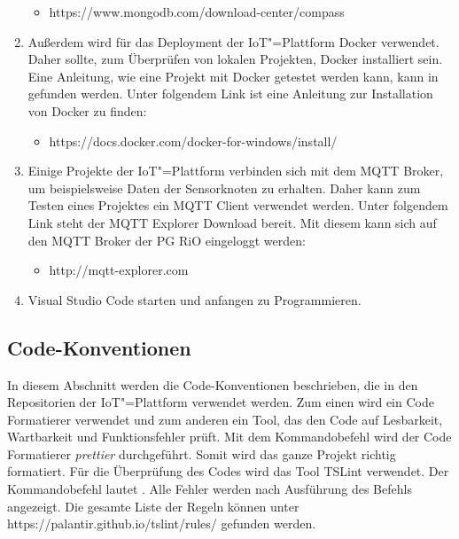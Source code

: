 \begin{enumerate}
	\begin{itemize}
		\item {https://www.mongodb.com/download-center/compass}
	\end{itemize}
	\item Außerdem wird für das Deployment der IoT"=Plattform Docker verwendet. Daher sollte, zum Überprüfen von lokalen Projekten, Docker installiert sein. Eine Anleitung, wie eine Projekt mit Docker getestet werden kann, kann in  gefunden werden. Unter folgendem Link ist eine Anleitung zur Installation von Docker zu finden: 
	\begin{itemize}
		\item {https://docs.docker.com/docker-for-windows/install/}
	\end{itemize}
	\item Einige Projekte der IoT"=Plattform verbinden sich mit dem MQTT Broker, um beispielsweise Daten der Sensorknoten zu erhalten. Daher kann zum Testen eines Projektes ein MQTT Client verwendet werden. Unter folgendem Link steht der MQTT Explorer Download bereit. Mit diesem kann sich auf den MQTT Broker der PG RiO eingeloggt werden: 
	\begin{itemize}
		\item {http://mqtt-explorer.com}
	\end{itemize}
	\item Visual Studio Code starten und anfangen zu Programmieren.
\end{enumerate}

\subsection{Code-Konventionen}
In diesem Abschnitt werden die Code-Konventionen beschrieben, die in den Repositorien der IoT"=Plattform verwendet werden. Zum einen wird ein Code Formatierer verwendet und zum anderen ein Tool, das den Code auf Lesbarkeit, Wartbarkeit und Funktionsfehler prüft. \newline
Mit dem Kommandobefehl  wird der Code Formatierer \textit{prettier} durchgeführt. Somit wird das ganze Projekt richtig formatiert. \newline
Für die Überprüfung des Codes wird das Tool TSLint verwendet. Der Kommandobefehl lautet . Alle Fehler werden nach Ausführung des Befehls angezeigt. Die gesamte Liste der Regeln können unter https://palantir.github.io/tslint/rules/ gefunden werden.

